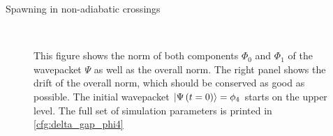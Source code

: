\begin{chapter}{Spawning in non-adiabatic crossings}
\begin{figure}[h!]
  \centering
   \\
  \caption[Norms and norm drift for a $\phi_4$ in an avoided crossing]{
  This figure shows the norm of both components $\Phi_0$ and $\Phi_1$ of the
  wavepacket $\Psi$ as well as the overall norm. The right panel shows the drift
  of the overall norm, which should be conserved as good as possible.
  The initial wavepacket $\Ket{\Psi\left( t=0 \right)} = \phi_4$ starts on the upper level.
  The full set of simulation parameters is printed in \ref{cfg:delta_gap_phi4}
  \label{fig:basic_delta_gap_phi4_norms}
  }
\end{figure}



\end{chapter}
